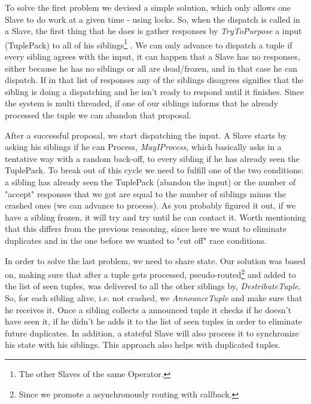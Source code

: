\documentclass[times, 10pt,twocolumn]{article}
\begin{document}
To solve the first problem we devised a simple solution, which only allows one Slave to do work at a given time - using locks. So, when the dispatch is called in a Slave, the first thing that he does is gather responses by \textit{TryToPurpose} a input (TuplePack) to all of his siblings\footnote
{%
	The other Slaves of the same Operator.
}   
. We can only advance to dispatch a tuple if every sibling agrees with the input, it can happen that a Slave has no responses, either because he has no siblings or all are dead/frozen, and in that case he can dispatch. If in that list of responses any of the siblings disagrees signifies that the sibling is doing a dispatching and he isn't ready to respond until it finishes. Since the system is multi threaded, if one of our siblings informs that he already processed the tuple we can abandon that proposal.

After a successful proposal, we start dispatching the input. A Slave starts by asking his siblings if he can Process, \textit{MayIProcess}, which basically asks in a tentative way with a random back-off, to every sibling if he has already seen the TuplePack. To break out of this cycle we need to fulfill one of the two conditions: a sibling has already seen the TuplePack (abandon the input) or the number of "accept" responses that we got are equal to the number of siblings minus the crashed ones (we can advance to process). As you probably figured it out, if we have a sibling frozen, it will try and try until he can contact it. Worth mentioning that this differs from the previous reasoning, since here we want to eliminate duplicates and in the one before we wanted to "cut off" race conditions. 

In order to solve the last problem, we need to share state. Our solution was based on, making sure that after a tuple gets processed, pseudo-routed\footnote
{%
	Since we promote a asynchronously routing with callback.
}   
and added to the list of seen tuples, was delivered to all the other siblings by, \textit{DestributeTuple}. So, for each sibling alive, i.e. not crashed, we \textit{AnnounceTuple} and make sure that he receives it. Once a sibling collects a announced tuple it checks if he doesn't have seen it, if he didn't he adds it to the list of seen tuples in order to eliminate future duplicates. In addition, a stateful Slave will also process it to synchronize his state with his siblings. This approach also helps with duplicated tuples.

\end{document}
